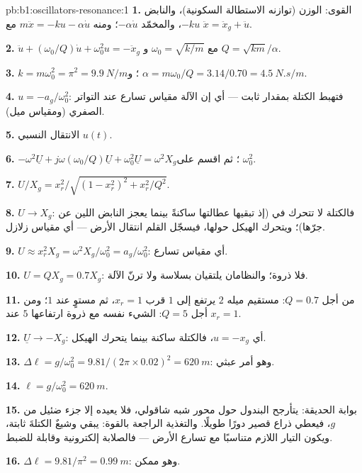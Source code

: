 \begin{solution}{pb:b1:oscillators-resonance:1}
\textbf{1.} القوى: الوزن (توازنه الاستطالة السكونية)، والنابض
$-ku$، والمخمّد $-\alpha\dot u$؛ ومنه $m\ddot x = -ku - \alpha\dot u$ مع $\ddot x =
\ddot x_g + \ddot u$.

\textbf{2.} $\ddot u + (\omega_0/Q)\dot u + \omega_0^2u = -\ddot x_g$ مع $\omega_0 =
\sqrt{k/m}$ و $Q = \sqrt{km}/\alpha$.

\textbf{3.} $k = m\omega_0^2 = \pi^2 = \qty{9.9}{N/m}$؛ و $\alpha = m\omega_0/Q =
3.14/0.70 = \qty{4.5}{N.s/m}$.

\textbf{4.} $u = -a_g/\omega_0^2$: فتهبط الكتلة بمقدار ثابت --- أي إن
الآلة مقياس تسارع عند التواتر الصفري (ومقياس ميل).

\textbf{5.} الانتقال النسبي $u(t)$.

\textbf{6.} $-\omega^2\underline U + j\omega(\omega_0/Q)\underline U + \omega_0^2\underline U
= \omega^2X_g$؛ ثم اقسم على $\omega_0^2$.

\textbf{7.} $U/X_g = x_r^2/\sqrt{(1 - x_r^2)^2 + x_r^2/Q^2}$.

\textbf{8.} $U \to X_g$: فالكتلة لا تتحرك في 
(إذ تبقيها عطالتها ساكنةً بينما يعجز النابض اللين عن جرّها)؛
ويتحرك الهيكل حولها، فيسجّل القلم انتقال الأرض
--- أي مقياس زلازل.

\textbf{9.} $U \approx x_r^2X_g = \omega^2X_g/\omega_0^2 = a_g/\omega_0^2$: أي
مقياس تسارع.

\textbf{10.} $U = QX_g = 0.7X_g$: فلا ذروة؛ والنظامان يلتقيان بسلاسة
ولا ترنّ الآلة.

\textbf{11.} من أجل $Q = 0.7$: مستقيم ميله $2$ يرتفع إلى $1$ قرب
$x_r = 1$، ثم مستوٍ عند $1$؛ ومن أجل $Q = 5$: الشيء نفسه مع ذروة ارتفاعها
$5$ عند $x_r = 1$.

\textbf{12.} $\underline U \to -X_g$: أي $u = -x_g$، فالكتلة ساكنة بينما
يتحرك الهيكل.

\textbf{13.} $\Delta\ell = g/\omega_0^2 = 9.81/(2\pi \times 0.02)^2 = \qty{620}{m}$:
وهو أمر عبثي.

\textbf{14.} $\ell = g/\omega_0^2 = \qty{620}{m}$.

\textbf{15.} بوابة الحديقة: يتأرجح البندول حول محور شبه
شاقولي، فلا يعيده إلا جزء ضئيل من $g$، فيعطي ذراع قصير
دورًا طويلًا. والتغذية الراجعة بالقوة: يبقي وشيعٌ الكتلةَ ثابتة،
ويكون التيار اللازم متناسبًا مع تسارع الأرض --- فالصلابة
إلكترونية وقابلة للضبط.

\textbf{16.} $\Delta\ell = 9.81/\pi^2 = \qty{0.99}{m}$: وهو ممكن.


\end{solution}
